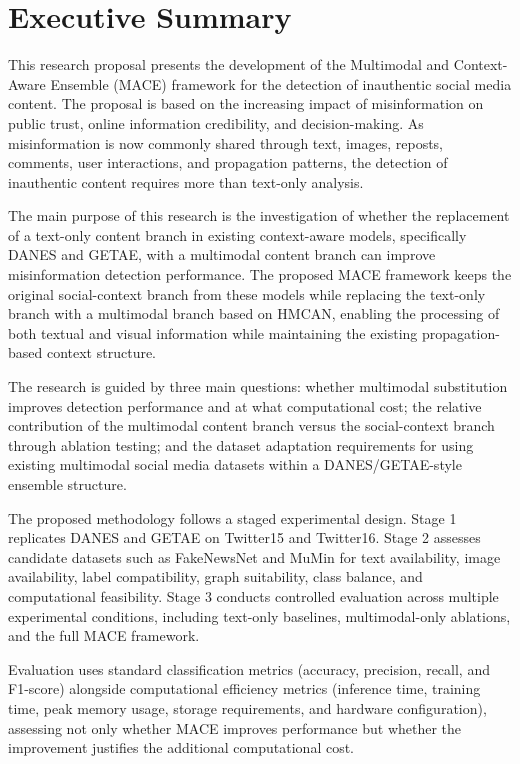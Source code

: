 \section*{Executive Summary}

This research proposal presents the development of the Multimodal and Context-Aware Ensemble
(MACE) framework for the detection of inauthentic social media content. The proposal is based on
the increasing impact of misinformation on public trust, online information credibility, and
decision-making. As misinformation is now commonly shared through text, images, reposts,
comments, user interactions, and propagation patterns, the detection of inauthentic content
requires more than text-only analysis.

The main purpose of this research is the investigation of whether the replacement of a text-only
content branch in existing context-aware models, specifically DANES and GETAE, with a multimodal
content branch can improve misinformation detection performance. The proposed MACE framework keeps
the original social-context branch from these models while replacing the text-only branch with a
multimodal branch based on HMCAN, enabling the processing of both textual and visual information
while maintaining the existing propagation-based context structure.

The research is guided by three main questions: whether multimodal substitution improves detection
performance and at what computational cost; the relative contribution of the multimodal content
branch versus the social-context branch through ablation testing; and the dataset adaptation
requirements for using existing multimodal social media datasets within a DANES/GETAE-style
ensemble structure.

The proposed methodology follows a staged experimental design. Stage 1 replicates DANES and GETAE
on Twitter15 and Twitter16. Stage 2 assesses candidate datasets such as FakeNewsNet and MuMin for
text availability, image availability, label compatibility, graph suitability, class balance, and
computational feasibility. Stage 3 conducts controlled evaluation across multiple experimental
conditions, including text-only baselines, multimodal-only ablations, and the full MACE framework.

Evaluation uses standard classification metrics (accuracy, precision, recall, and F1-score)
alongside computational efficiency metrics (inference time, training time, peak memory usage,
storage requirements, and hardware configuration), assessing not only whether MACE improves
performance but whether the improvement justifies the additional computational cost.
